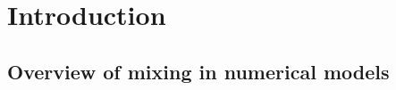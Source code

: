 \documentclass[draft]{agujournal2019}
\begin{document}
%
%

%


%
%
%
%

\section{Introduction}

\subsection{Overview of mixing in numerical models}
\end{document}

